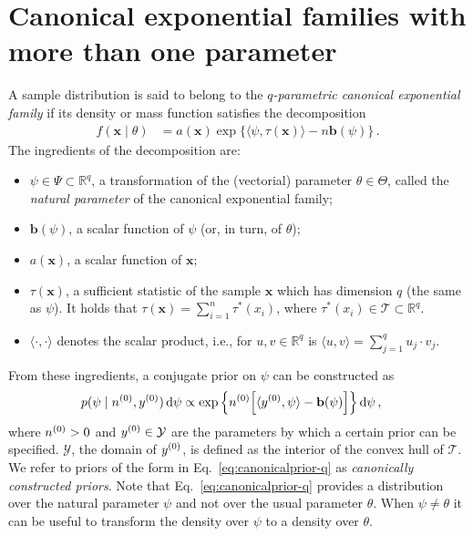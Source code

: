 \documentclass[12pt,a4paper	,twoside]{article}
\newcommand{\reals}{\mathbb{R}}
\newcommand{\dd}{\,\mathrm{d}}
\newcommand{\mbf}[1]{\mathbf{#1}}
\newcommand{\bs}[1]{\boldsymbol{#1}}
\renewcommand{\vec}[1]{{\bs#1}}
\begin{document}
\section{Canonical exponential families with more than one parameter}
\label{sec:q-paramexpofam}

A sample distribution is said to belong to the \emph{$q$-parametric canonical exponential family}
if its density or mass function satisfies the decomposition
\begin{align}
f(\vec{x} \mid \theta) &= a(\vec{x})\exp\big\{\langle \psi, \tau(\vec{x}) \rangle - n \mbf{b}(\psi)\big\}\,.
\label{eq:expofam-sampledens-q}
\end{align}
The ingredients of the decomposition are:
\begin{itemize}
\item $\psi \in \Psi \subset \reals^q$, a transformation of the (vectorial) parameter $\theta \in \Theta$,
called the \emph{natural parameter} of the canonical exponential family;
\item $\mbf{b}(\psi)$, a scalar function of $\psi$ (or, in turn, of $\theta$);
\item $a(\vec{x})$, a scalar function of $\vec{x}$;
\item $\tau(\vec{x})$, a sufficient statistic of the sample $\vec{x}$ which has dimension $q$ (the same as $\psi$).
It holds that $\tau(\vec{x}) = \sum_{i=1}^n \tau^*(x_i)$,
where $\tau^*(x_i) \in \mathcal{T} \subset \reals^q$.
\item $\langle\cdot, \cdot\rangle$ denotes the scalar product,
i.e., for $u, v \in \reals^q$ is $\langle u, v\rangle = \sum_{j=1}^q u_j \cdot v_j$.
\end{itemize}

From these ingredients, a conjugate prior on $\psi$ can be constructed as
\begin{align}
p(\psi \mid \nz, \yz) \dd\psi
 &\propto \exp\Big\{ \nz \Big[ \langle \yz, \psi \rangle - \mbf{b}(\psi) \Big] \Big\} \dd\psi\,,
\label{eq:canonicalprior-q}
\end{align}
where $n^{(0)} > 0$ and $y^{(0)} \in \mathcal{Y}$ are the parameters by which a certain prior can be specified.
$\mathcal{Y}$, the domain of $y^{(0)}$, is defined as the interior of the convex hull of $\mathcal{T}$.
We refer to priors of the form in Eq.~\eqref{eq:canonicalprior-q} as \emph{canonically constructed priors}.
Note that Eq.~\eqref{eq:canonicalprior-q} provides a distribution over the natural parameter $\psi$ and not over the usual parameter $\theta$.
When $\psi \neq \theta$ it can be useful to transform the density over $\psi$ to a density over $\theta$.
\end{document}
